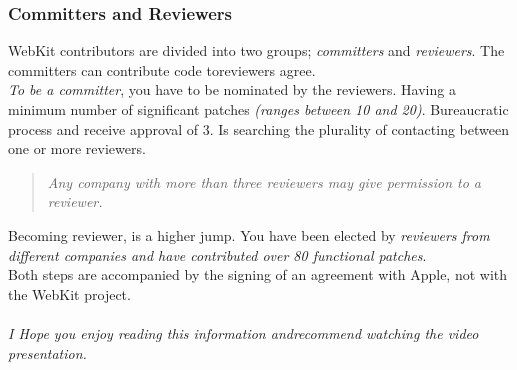 \subsubsection{ Committers and Reviewers} WebKit contributors are divided into two groups; \textit{committers} and \textit{reviewers}. The committers can contribute code to\nolinebreakthe reviewers agree.
\\\textit{To be a committer}, you have to be nominated by the reviewers. Having a minimum number of significant patches \textit{(ranges between 10 and 20)}. Bureaucratic process and receive approval of 3. Is searching the plurality of contacting between one or more reviewers.
\begin{quotation}\textit{Any company with more than three reviewers may give permission to a reviewer.}
\end{quotation} Becoming reviewer, is a higher jump. You have been elected by \textit{reviewers from different companies and have contributed over 80 functional patches}.
\\ Both steps are accompanied by the signing of an agreement with Apple, not with the WebKit project.
\\
\\\textit{I Hope you enjoy reading this information and\nolinebreakI recommend watching the video presentation.}